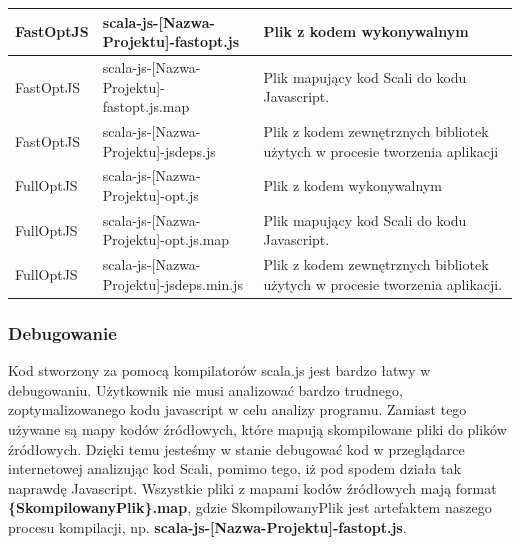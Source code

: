 \begin{center}
\begin{tabular}{| l | l | p{8cm} |}
\hline
FastOptJS & scala-js-[Nazwa-Projektu]-fastopt.js & Plik z kodem wykonywalnym \\ \hline

FastOptJS & scala-js-[Nazwa-Projektu]-fastopt.js.map & Plik mapujący kod Scali do kodu Javascript. \\ \hline

FastOptJS & scala-js-[Nazwa-Projektu]-jsdeps.js & Plik z kodem zewnętrznych bibliotek użytych w procesie tworzenia aplikacji \\ \hline

 \hline \hline

FullOptJS & scala-js-[Nazwa-Projektu]-opt.js & Plik z kodem wykonywalnym \\ \hline

FullOptJS & scala-js-[Nazwa-Projektu]-opt.js.map & Plik mapujący kod Scali do kodu Javascript. \\ \hline

FullOptJS & scala-js-[Nazwa-Projektu]-jsdeps.min.js & Plik z kodem zewnętrznych bibliotek użytych w procesie tworzenia aplikacji. \\ \hline
\hline
\end{tabular}
\end{center}
\subsubsection{Debugowanie}

Kod stworzony za pomocą kompilatorów scala.js jest bardzo łatwy w debugowaniu. Użytkownik nie musi analizować bardzo trudnego, zoptymalizowanego kodu javascript w celu analizy programu. Zamiast tego używane są mapy kodów źródłowych\cite{SourceMapProposal}, które mapują skompilowane pliki do plików źródłowych. Dzięki temu jesteśmy w stanie debugować kod w przeglądarce internetowej analizując kod Scali, pomimo tego, iż pod spodem działa tak naprawdę Javascript.
Wszystkie pliki z mapami kodów źródłowych mają format \textbf{\{SkompilowanyPlik\}.map}, gdzie SkompilowanyPlik jest artefaktem naszego procesu kompilacji, np.  \textbf{scala-js-[Nazwa-Projektu]-fastopt.js}.

